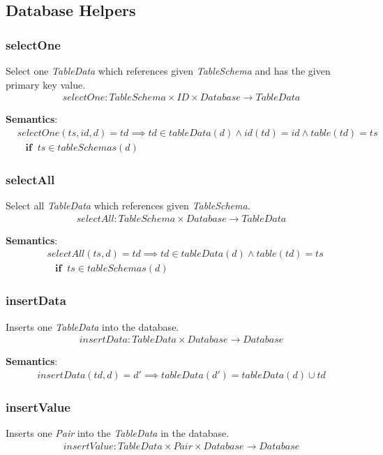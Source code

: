 \documentclass[10pt]{article}
\begin{document}
\subsection{Database Helpers}
\subsubsection{selectOne}
Select one \emph{TableData} which references given \emph{TableSchema} and has the given primary key value.
\begin{align}
selectOne: TableSchema \times ID \times  Database \rightarrow TableData
\end{align}

\textbf{Semantics}:
\begin{align}
& selectOne(ts, id, d) = td \implies td \in tableData(d) \land id(td) = id \land table(td) = ts \nonumber \\
& \;\;\; \mathbf{if}  \;\; ts \in tableSchemas(d)
\end{align}

\subsubsection{selectAll}
Select all \emph{TableData} which references given \emph{TableSchema}.
\begin{align}
selectAll: TableSchema \times  Database \rightarrow TableData
\end{align}

\textbf{Semantics}:
\begin{align}
& selectAll(ts, d) = td \implies td \in tableData(d) \land table(td) = ts \nonumber \\
& \;\;\; \mathbf{if}  \;\; ts \in tableSchemas(d)
\end{align}

\subsubsection{insertData}
Inserts one \emph{TableData} into the database.
\begin{align}
insertData: TableData \times Database \rightarrow Database
\end{align}

\textbf{Semantics}:
\begin{align}
insertData(td, d) = d' \implies tableData(d') = tableData(d) \cup td 
\end{align}

\subsubsection{insertValue}
Inserts one \emph{Pair} into the \emph{TableData} in the database.
\begin{align}
insertValue: TableData \times Pair \times  Database \rightarrow Database
\end{align}
\end{document}
